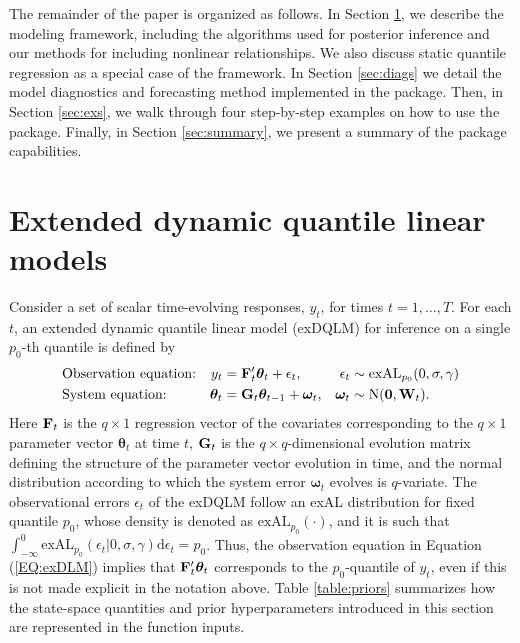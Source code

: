 \documentclass[jss]{jss}
\begin{document}
The remainder of the paper is organized as follows. In Section \ref{sec:exdqlm}, we describe the modeling framework, including the algorithms used for posterior inference and our methods for including nonlinear relationships. We also discuss static quantile regression as a special case of the framework. In Section \ref{sec:diags} we detail the model diagnostics and forecasting method implemented in the package. Then, in Section \ref{sec:exs}, we walk through four step-by-step examples on how to use the package. Finally, in Section \ref{sec:summary}, we present a summary of the package capabilities.



\section{Extended dynamic quantile linear models}
\label{sec:exdqlm}

Consider a set of scalar time-evolving responses, $y_t$, for times $t=1,\dots,T$. For each $t$, an extended dynamic quantile linear model (exDQLM) for inference on a single $p_0$-th quantile is defined by
\begin{align}
\label{EQ:exDLM}
& \text{Observation equation:} & y_t &= {\bf F}'_t \boldsymbol{\theta}_t + \epsilon_t,  & \epsilon_t & \sim \text{exAL}_{p_0}(0,\sigma,\gamma) \\
\label{EQ:exDLMevo}
& \text{System equation:} & \boldsymbol{\theta}_t &= {\bf G}_t \boldsymbol{\theta}_{t-1} + \boldsymbol{\omega}_t, & \boldsymbol{\omega}_t  & \sim \text{N}({\bf 0},{\bf W}_t).
\end{align}
Here ${\bf F}_t$ is the $q \times 1$ regression vector of the covariates corresponding to the $q \times 1$ parameter vector $\boldsymbol{\theta}_t$ at time $t$, ${\bf G}_t$ is the $q\times q$-dimensional evolution matrix defining the structure of the parameter vector evolution in time, and the normal distribution according to which the system error $\boldsymbol{\omega}_t$ evolves is $q$-variate. The observational errors $\epsilon_t$ of the exDQLM follow an exAL distribution for fixed quantile $p_0$, whose density is denoted as $\text{exAL}_{p_0}(\cdot)$, and it is such that $\int_{-\infty}^0 \text{exAL}_{p_0}(\epsilon_t |0,\sigma,\gamma) \mathrm{d}\epsilon_t = p_0$. Thus, the observation equation in Equation (\ref{EQ:exDLM}) implies that ${\bf F}'_t \boldsymbol{\theta}_t$ corresponds to the $p_0$-quantile of $y_t$,
even if this is not made explicit in the notation above. Table \ref{table:priors} summarizes how the state-space quantities and prior hyperparameters introduced in this section are represented in the  function inputs.
\end{document}
